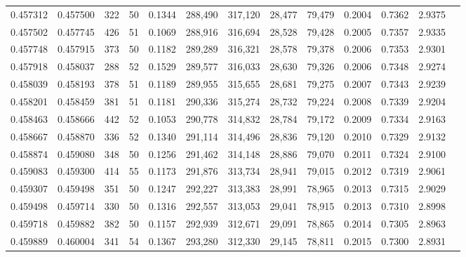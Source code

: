 \begin{tabular}{rrrrrrrrrrrrr}
0.457312 & 0.457500 &   322 &  50 &                                     0.1344 & 288,490 & 317,120 &  28,477 &  79,479 & 0.2004 & 0.7362 & 2.9375 \\
0.457502 & 0.457745 &   426 &  51 &                                     0.1069 & 288,916 & 316,694 &  28,528 &  79,428 & 0.2005 & 0.7357 & 2.9335 \\
0.457748 & 0.457915 &   373 &  50 &                                     0.1182 & 289,289 & 316,321 &  28,578 &  79,378 & 0.2006 & 0.7353 & 2.9301 \\
0.457918 & 0.458037 &   288 &  52 &                                     0.1529 & 289,577 & 316,033 &  28,630 &  79,326 & 0.2006 & 0.7348 & 2.9274 \\
0.458039 & 0.458193 &   378 &  51 &                                     0.1189 & 289,955 & 315,655 &  28,681 &  79,275 & 0.2007 & 0.7343 & 2.9239 \\
0.458201 & 0.458459 &   381 &  51 &                                     0.1181 & 290,336 & 315,274 &  28,732 &  79,224 & 0.2008 & 0.7339 & 2.9204 \\
0.458463 & 0.458666 &   442 &  52 &                                     0.1053 & 290,778 & 314,832 &  28,784 &  79,172 & 0.2009 & 0.7334 & 2.9163 \\
0.458667 & 0.458870 &   336 &  52 &                                     0.1340 & 291,114 & 314,496 &  28,836 &  79,120 & 0.2010 & 0.7329 & 2.9132 \\
0.458874 & 0.459080 &   348 &  50 &                                     0.1256 & 291,462 & 314,148 &  28,886 &  79,070 & 0.2011 & 0.7324 & 2.9100 \\
0.459083 & 0.459300 &   414 &  55 &                                     0.1173 & 291,876 & 313,734 &  28,941 &  79,015 & 0.2012 & 0.7319 & 2.9061 \\
0.459307 & 0.459498 &   351 &  50 &                                     0.1247 & 292,227 & 313,383 &  28,991 &  78,965 & 0.2013 & 0.7315 & 2.9029 \\
0.459498 & 0.459714 &   330 &  50 &                                     0.1316 & 292,557 & 313,053 &  29,041 &  78,915 & 0.2013 & 0.7310 & 2.8998 \\
0.459718 & 0.459882 &   382 &  50 &                                     0.1157 & 292,939 & 312,671 &  29,091 &  78,865 & 0.2014 & 0.7305 & 2.8963 \\
0.459889 & 0.460004 &   341 &  54 &                                     0.1367 & 293,280 & 312,330 &  29,145 &  78,811 & 0.2015 & 0.7300 & 2.8931 \\

\end{tabular}
